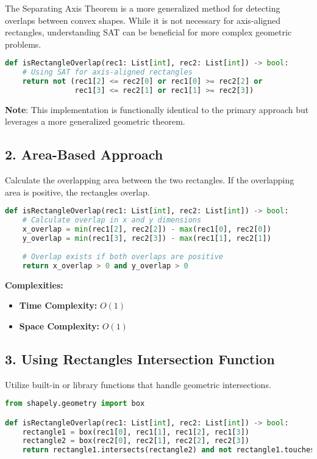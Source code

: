 The Separating Axis Theorem is a more generalized method for detecting overlaps between convex shapes. While it is not necessary for axis-aligned rectangles, understanding SAT can be beneficial for more complex geometric problems.

\begin{lstlisting}[language=Python]
def isRectangleOverlap(rec1: List[int], rec2: List[int]) -> bool:
    # Using SAT for axis-aligned rectangles
    return not (rec1[2] <= rec2[0] or rec1[0] >= rec2[2] or
                rec1[3] <= rec2[1] or rec1[1] >= rec2[3])
\end{lstlisting}

\textbf{Note}: This implementation is functionally identical to the primary approach but leverages a more generalized geometric theorem.

\subsection*{2. Area-Based Approach}

Calculate the overlapping area between the two rectangles. If the overlapping area is positive, the rectangles overlap.

\begin{lstlisting}[language=Python]
def isRectangleOverlap(rec1: List[int], rec2: List[int]) -> bool:
    # Calculate overlap in x and y dimensions
    x_overlap = min(rec1[2], rec2[2]) - max(rec1[0], rec2[0])
    y_overlap = min(rec1[3], rec2[3]) - max(rec1[1], rec2[1])
    
    # Overlap exists if both overlaps are positive
    return x_overlap > 0 and y_overlap > 0
\end{lstlisting}

\textbf{Complexities:}
\begin{itemize}
    \item \textbf{Time Complexity:} \(O(1)\)
    \item \textbf{Space Complexity:} \(O(1)\)
\end{itemize}

\subsection*{3. Using Rectangles Intersection Function}

Utilize built-in or library functions that handle geometric intersections.

\begin{lstlisting}[language=Python]
from shapely.geometry import box

def isRectangleOverlap(rec1: List[int], rec2: List[int]) -> bool:
    rectangle1 = box(rec1[0], rec1[1], rec1[2], rec1[3])
    rectangle2 = box(rec2[0], rec2[1], rec2[2], rec2[3])
    return rectangle1.intersects(rectangle2) and not rectangle1.touches(rectangle2)
\end{lstlisting}

